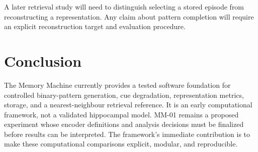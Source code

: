 \documentclass[11pt,a4paper]{article}
\begin{document}
A later retrieval study will need to distinguish selecting a stored episode from reconstructing a representation. Any claim about pattern completion will require an explicit reconstruction target and evaluation procedure.

\section{Conclusion}

The Memory Machine currently provides a tested software foundation for controlled binary-pattern generation, cue degradation, representation metrics, storage, and a nearest-neighbour retrieval reference. It is an early computational framework, not a validated hippocampal model. MM-01 remains a proposed experiment whose encoder definitions and analysis decisions must be finalized before results can be interpreted. The framework's immediate contribution is to make these computational comparisons explicit, modular, and reproducible.



\end{document}
